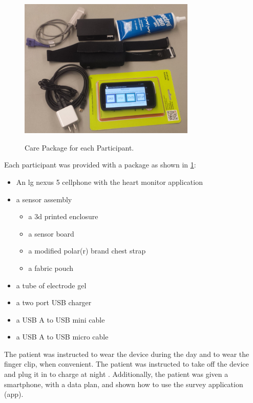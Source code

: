 \begin{figure}
 \begin{center}
  \label{fig:CarePackage}
  \includegraphics[scale=1,width=0.75\textwidth]{Images/carePackage.png} 
  \caption{Care Package for each Participant.} 
 \end{center}
\end{figure}



Each participant was provided with a package as shown in \cref{fig:CarePackage}:
\begin{itemize}
\item An lg nexus 5 cellphone with the heart monitor application
\item a sensor assembly
	\begin{itemize}
	\item a 3d printed enclosure
	\item a sensor board
	\item a modified polar(r) brand chest strap
	\item a fabric pouch
	\end{itemize}
\item a tube of electrode gel
\item a two port USB charger
\item a USB A to USB mini cable
\item a USB A to USB micro cable
\end{itemize}

The patient was instructed to wear the device during the day and to wear the finger clip, when convenient. The patient was instructed to take off the device and plug it in to charge at night . Additionally, the patient was given a smartphone, with a data plan, and shown how to use the survey application (app). 

